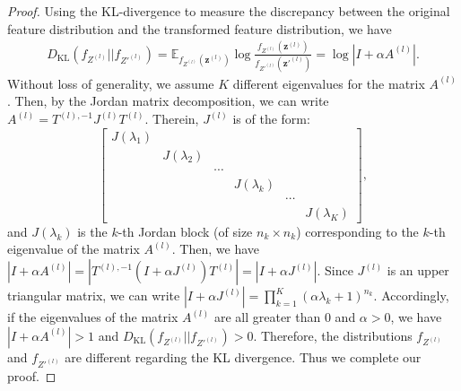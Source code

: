 \documentclass{article} \usepackage{iclr2022_conference,times}
\begin{document}
\begin{proof}
Using the KL-divergence to measure the discrepancy between the original feature distribution and the transformed feature distribution, we have 
\begin{equation}\begin{aligned}
    D_\text{KL}(f_{Z^{(l)}} || f_{{Z'}^{(l)}})=\mathbb{E}_{f_{Z^{(l)}}(\boldsymbol{z}^{(l)})} \log \frac{f_{Z^{(l)}}(\boldsymbol{z}^{(l)})}{f_{{Z'}^{(l)}}(\boldsymbol{z}'^{(l)})}
    =\log \left\lvert I+\alpha A^{(l)} \right\rvert. 
\end{aligned}\end{equation}
{Without loss of generality, we assume $K$ different eigenvalues for the matrix $A^{(l)}$. Then, by the Jordan matrix decomposition, we can write $A^{(l)}=T^{(l),-1} J^{(l)} T^{(l)}$. Therein, $J^{(l)}$ is of the form:}
\begin{equation}{
    \begin{bmatrix}
J(\lambda_1) & &&&&   \\ 
& J(\lambda_2) & &&&  \\
& & \cdots      &  && \\ 
&& & J(\lambda_k) & & \\ 
&&& & \cdots       &  \\ 
&&&& & J(\lambda_K) 
\end{bmatrix}},
\end{equation}
{and $J(\lambda_k)$ is the $k$-th Jordan block (of size $n_k\times n_k$) corresponding to the $k$-th eigenvalue of the matrix $A^{(l)}$. Then, we have $\left\lvert I+\alpha A^{(l)} \right\rvert=\left\lvert T^{(l),-1} (I+\alpha J^{(l)}) T^{(l)} \right\rvert=\left\lvert I+\alpha J^{(l)} \right\rvert$. Since $J^{(l)}$ is an upper triangular matrix, we can write $\left\lvert I+\alpha J^{(l)} \right\rvert=\prod_{k=1}^{K} (\alpha\lambda_k+1)^{n_k}$. Accordingly, if the eigenvalues of the matrix $A^{(l)}$ are all greater than $0$ and $\alpha >0$, we have $\left\lvert I+\alpha A^{(l)} \right\rvert>1$ and $D_\text{KL}(f_{Z^{(l)}} || f_{{Z'}^{(l)}})>0$. Therefore, the distributions $f_{Z^{(l)}}$ and $ f_{{Z'}^{(l)}}$ are different regarding the KL divergence. Thus we complete our proof.}
\end{proof}
\end{document}
